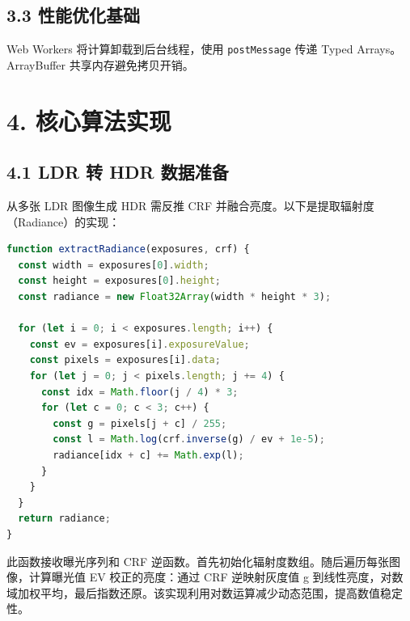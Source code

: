 \section{3.3 性能优化基础}
Web Workers 将计算卸载到后台线程，使用 \texttt{postMessage} 传递 Typed Arrays。ArrayBuffer 共享内存避免拷贝开销。\par
\chapter{4. 核心算法实现}
\section{4.1 LDR 转 HDR 数据准备}
从多张 LDR 图像生成 HDR 需反推 CRF 并融合亮度。以下是提取辐射度（Radiance）的实现：\par
\begin{lstlisting}[language=javascript]
function extractRadiance(exposures, crf) {
  const width = exposures[0].width;
  const height = exposures[0].height;
  const radiance = new Float32Array(width * height * 3);
  
  for (let i = 0; i < exposures.length; i++) {
    const ev = exposures[i].exposureValue;
    const pixels = exposures[i].data;
    for (let j = 0; j < pixels.length; j += 4) {
      const idx = Math.floor(j / 4) * 3;
      for (let c = 0; c < 3; c++) {
        const g = pixels[j + c] / 255;
        const l = Math.log(crf.inverse(g) / ev + 1e-5);
        radiance[idx + c] += Math.exp(l);
      }
    }
  }
  return radiance;
}
\end{lstlisting}
此函数接收曝光序列和 CRF 逆函数。首先初始化辐射度数组。随后遍历每张图像，计算曝光值 EV 校正的亮度：通过 CRF 逆映射灰度值 g 到线性亮度，对数域加权平均，最后指数还原。该实现利用对数运算减少动态范围，提高数值稳定性。\par
